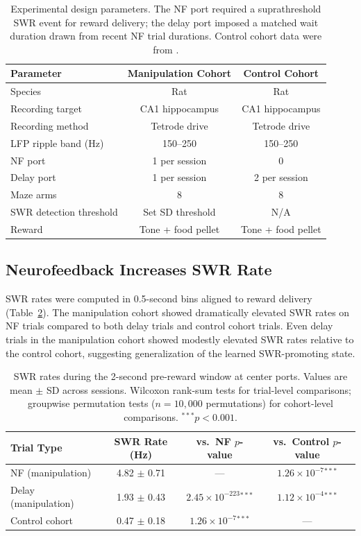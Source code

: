 \documentclass[11pt]{article}
\begin{document}
\begin{table}[H]
\centering
\caption{Experimental design parameters. The NF port required a suprathreshold SWR event for reward delivery; the delay port imposed a matched wait duration drawn from recent NF trial durations. Control cohort data were from \citet{gillespie2021}.}
\label{tab:design}
\begin{tabular}{lcc}
\toprule
\textbf{Parameter} & \textbf{Manipulation Cohort} & \textbf{Control Cohort} \\
\midrule
Species & Rat & Rat \\
Recording target & CA1 hippocampus & CA1 hippocampus \\
Recording method & Tetrode drive & Tetrode drive \\
LFP ripple band (Hz) & 150--250 & 150--250 \\
NF port & 1 per session & 0 \\
Delay port & 1 per session & 2 per session \\
Maze arms & 8 & 8 \\
SWR detection threshold & Set SD threshold & N/A \\
Reward & Tone + food pellet & Tone + food pellet \\
\bottomrule
\end{tabular}
\end{table}

\subsection{Neurofeedback Increases SWR Rate}

SWR rates were computed in 0.5-second bins aligned to reward delivery (Table~\ref{tab:swr_rates}). The manipulation cohort showed dramatically elevated SWR rates on NF trials compared to both delay trials and control cohort trials. Even delay trials in the manipulation cohort showed modestly elevated SWR rates relative to the control cohort, suggesting generalization of the learned SWR-promoting state.

\begin{table}[H]
\centering
\caption{SWR rates during the 2-second pre-reward window at center ports. Values are mean $\pm$ SD across sessions. Wilcoxon rank-sum tests for trial-level comparisons; groupwise permutation tests ($n = 10{,}000$ permutations) for cohort-level comparisons. $^{\ast\ast\ast}p < 0.001$.}
\label{tab:swr_rates}
\begin{tabular}{lccc}
\toprule
\textbf{Trial Type} & \textbf{SWR Rate (Hz)} & \textbf{vs.\ NF $p$-value} & \textbf{vs.\ Control $p$-value} \\
\midrule
NF (manipulation) & 4.82 $\pm$ 0.71 & --- & $1.26 \times 10^{-7}$$^{\ast\ast\ast}$ \\
Delay (manipulation) & 1.93 $\pm$ 0.43 & $2.45 \times 10^{-223}$$^{\ast\ast\ast}$ & $1.12 \times 10^{-4}$$^{\ast\ast\ast}$ \\
Control cohort & 0.47 $\pm$ 0.18 & $1.26 \times 10^{-7}$$^{\ast\ast\ast}$ & --- \\
\bottomrule
\end{tabular}
\end{table}
\end{document}
